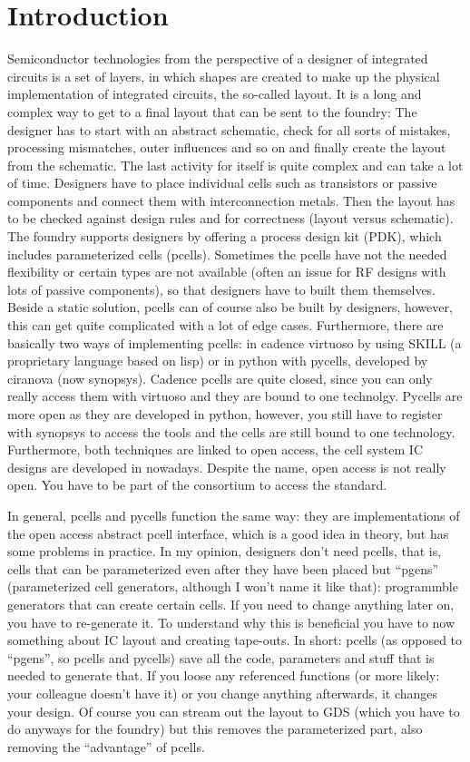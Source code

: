 \section{Introduction}
Semiconductor technologies from the perspective of a designer of integrated circuits is a set of layers, in which shapes are created to make up the physical
implementation of integrated circuits, the so-called layout. It is a long and complex way to get to a final layout that can be sent to the foundry: The designer has
to start with an abstract schematic, check for all sorts of mistakes, processing mismatches, outer influences and so on and finally create the layout from the
schematic. The last activity for itself is quite complex and can take a lot of time. Designers have to place individual cells such as transistors or passive
components and connect them with interconnection metals. Then the layout has to be checked against design rules and for correctness (layout versus schematic).
The foundry supports designers by offering a process design kit (PDK), which includes parameterized cells (pcells). Sometimes the pcells have not the needed
flexibility or certain types are not available (often an issue for RF designs with lots of passive components), so that designers have to built them themselves.
Beside a static solution, pcells can of course also be built by designers, however, this can get quite complicated with a lot of edge cases. Furthermore, there are
basically two ways of implementing pcells: in cadence virtuoso by using SKILL (a proprietary language based on lisp) or in python with pycells, developed by ciranova
(now synopsys). Cadence pcells are quite closed, since you can only really access them with virtuoso and they are bound to one technolgy. Pycells are more open as
they are developed in python, however, you still have to register with synopsys to access the tools and the cells are still bound to one technology. Furthermore,
both techniques are linked to open access, the cell system IC designs are developed in nowadays. Despite the name, open access is not really open. You have to be
part of the consortium to access the standard.

In general, pcells and pycells function the same way: they are implementations of the open access abstract pcell interface, which is a good idea in theory, but has
some problems in practice. In my opinion, designers don't need pcells, that is, cells that can be parameterized even after they have been placed but \enquote{pgens}
(parameterized cell generators, although I won't name it like that): programmble generators that can create certain cells. If you need to change anything later on,
you have to re-generate it. To understand why this is beneficial you have to now something about IC layout and creating tape-outs. In short: pcells (as opposed to
\enquote{pgens}, so pcells and pycells) save all the code, parameters and stuff that is needed to generate that. If you loose any referenced functions (or more
likely: your colleague doesn't have it) or you change anything afterwards, it changes your design. Of course you can stream out the layout to GDS (which you have to
do anyways for the foundry) but this removes the parameterized part, also removing the \enquote{advantage} of pcells.

